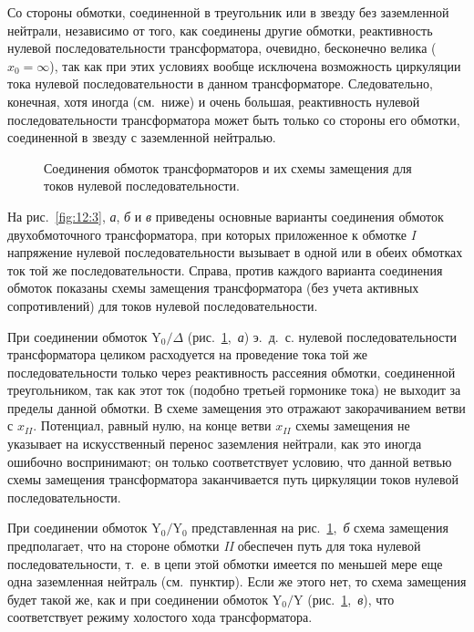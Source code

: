 Со стороны обмотки, соединенной в треугольник или в звезду без заземленной нейтрали, независимо от того, как соединены другие обмотки, реактивность нулевой последовательности трансформатора, очевидно, бесконечно велика ($ x_0 = \infty $), так как при этих условиях вообще исключена возможность циркуляции тока нулевой последовательности в данном трансформаторе. Следовательно, конечная, хотя иногда (см.~ниже) и очень большая, реактивность нулевой последовательности трансформатора может быть только со стороны его обмотки, соединенной в звезду с заземленной нейтралью.

\begin{figure} %
	
	\caption{Соединения обмоток трансформаторов и их схемы замещения для токов нулевой последовательности.}
	\label{fig:12-3}
\end{figure}

На рис.~\ref{fig:12:3}, \textit{а}, \textit{б} и \textit{в} приведены основные варианты соединения обмоток двухобмоточного трансформатора, при которых приложенное к обмотке \textit{I} напряжение нулевой последовательности вызывает в одной или в обеих обмотках ток той же последовательности. Справа, против каждого варианта соединения обмоток показаны схемы замещения трансформатора (без учета активных сопротивлений) для токов нулевой последовательности.

При соединении обмоток $ \text{Y}_0 / \Delta $ (рис.~\ref{fig:12-3},~\textit{а}) э.~д.~с. нулевой последовательности трансформатора целиком расходуется на проведение тока той же последовательности только через реактивность рассеяния обмотки, соединенной треугольником, так как этот ток (подобно третьей гормонике тока) не выходит за пределы данной обмотки. В схеме замещения это отражают закорачиванием ветви с $ x_{II} $. Потенциал, равный нулю, на конце ветви $ x_{II} $ схемы замещения не указывает на искусственный перенос заземления нейтрали, как это иногда ошибочно воспринимают; он только соответствует условию, что данной ветвью схемы замещения трансформатора заканчивается путь циркуляции токов нулевой последовательности.

При соединении обмоток $ \text{Y}_0 / \text{Y}_0 $ представленная на рис.~\ref{fig:12-3},~\textit{б} схема замещения предполагает, что на стороне обмотки \textit{II} обеспечен путь для тока нулевой последовательности, т.~е. в цепи этой обмотки имеется по меньшей мере еще одна заземленная нейтраль (см.~пунктир). Если же этого нет, то схема замещения будет такой же, как и при соединении обмоток $ \text{Y}_0 / \text{Y} $ (рис.~\ref{fig:12-3},~\textit{в}), что соответствует режиму холостого хода трансформатора.

